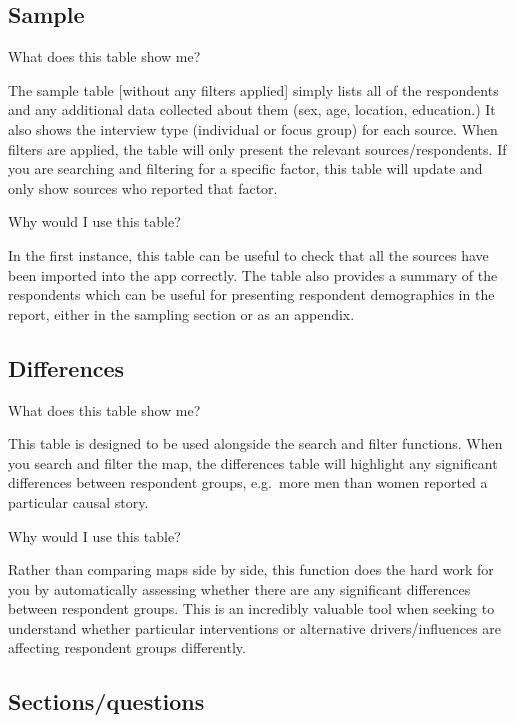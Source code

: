 \documentclass[
]{book}
\begin{document}
\hypertarget{sample}{%
\subsection{Sample}\label{sample}}

What does this table show me?

The sample table {[}without any filters applied{]} simply lists all of the respondents and any additional data collected about them (sex, age, location, education.) It also shows the interview type (individual or focus group) for each source. When filters are applied, the table will only present the relevant sources/respondents. If you are searching and filtering for a specific factor, this table will update and only show sources who reported that factor.

Why would I use this table?

In the first instance, this table can be useful to check that all the sources have been imported into the app correctly. The table also provides a summary of the respondents which can be useful for presenting respondent demographics in the report, either in the sampling section or as an appendix.

\hypertarget{differences}{%
\subsection{Differences}\label{differences}}

What does this table show me?

This table is designed to be used alongside the search and filter functions. When you search and filter the map, the differences table will highlight any significant differences between respondent groups, e.g.~more men than women reported a particular causal story.

Why would I use this table?

Rather than comparing maps side by side, this function does the hard work for you by automatically assessing whether there are any significant differences between respondent groups. This is an incredibly valuable tool when seeking to understand whether particular interventions or alternative drivers/influences are affecting respondent groups differently.

\hypertarget{sectionsquestions}{%
\subsection{Sections/questions}\label{sectionsquestions}}
\end{document}
